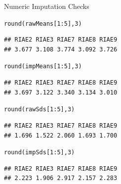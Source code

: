 \documentclass{beamer}\usepackage[]{graphicx}\usepackage[]{color}
\makeatletter
\newcommand{\hlnum}[1]{\textcolor[rgb]{0.69,0.494,0}{#1}}%
\newcommand{\hlopt}[1]{\textcolor[rgb]{0,0,0}{#1}}%
\newcommand{\hlstd}[1]{\textcolor[rgb]{0,0,0}{#1}}%
\newcommand{\hlkwd}[1]{\textcolor[rgb]{0.004,0.004,0.506}{#1}}%
\newenvironment{kframe}{%
 \def\at@end@of@kframe{}%
 \ifinner\ifhmode%
  \def\at@end@of@kframe{\end{minipage}}%
  \begin{minipage}{\columnwidth}%
 \fi\fi%
 \def\FrameCommand##1{\hskip\@totalleftmargin \hskip-\fboxsep
 \colorbox{shadecolor}{##1}\hskip-\fboxsep
     \hskip-\linewidth \hskip-\@totalleftmargin \hskip\columnwidth}%
 \MakeFramed {\advance\hsize-\width
   \@totalleftmargin\z@ \linewidth\hsize
   \@setminipage}}%
 {\par\unskip\endMakeFramed%
 \at@end@of@kframe}
\newenvironment{knitrout}{}{} %
\makeatother
\begin{document}
\begin{frame}{Numeric Imputation Checks}

\begin{knitrout}\footnotesize
{}\color{fgcolor}\begin{kframe}
\begin{alltt}
\hlkwd{round}\hlstd{(rawMeans[}\hlnum{1} \hlopt{:} \hlnum{5}\hlstd{],} \hlnum{3}\hlstd{)}
\end{alltt}
\begin{verbatim}
## RIAE2 RIAE3 RIAE7 RIAE8 RIAE9 
## 3.677 3.108 3.774 3.092 3.726
\end{verbatim}
\begin{alltt}
\hlkwd{round}\hlstd{(impMeans[}\hlnum{1} \hlopt{:} \hlnum{5}\hlstd{],} \hlnum{3}\hlstd{)}
\end{alltt}
\begin{verbatim}
## RIAE2 RIAE3 RIAE7 RIAE8 RIAE9 
## 3.697 3.122 3.340 3.134 3.010
\end{verbatim}
\end{kframe}
\end{knitrout}

\pagebreak

\begin{knitrout}\footnotesize
{}\color{fgcolor}\begin{kframe}
\begin{alltt}
\hlkwd{round}\hlstd{(rawSds[}\hlnum{1} \hlopt{:} \hlnum{5}\hlstd{],} \hlnum{3}\hlstd{)}
\end{alltt}
\begin{verbatim}
## RIAE2 RIAE3 RIAE7 RIAE8 RIAE9 
## 1.696 1.522 2.060 1.693 1.700
\end{verbatim}
\begin{alltt}
\hlkwd{round}\hlstd{(impSds[}\hlnum{1} \hlopt{:} \hlnum{5}\hlstd{],} \hlnum{3}\hlstd{)}
\end{alltt}
\begin{verbatim}
## RIAE2 RIAE3 RIAE7 RIAE8 RIAE9 
## 2.223 1.906 2.917 2.157 2.283
\end{verbatim}
\end{kframe}
\end{knitrout}

\pagebreak


\end{frame}
\end{document}
